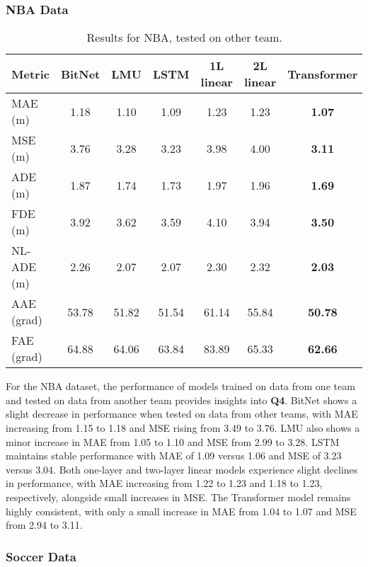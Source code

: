 \subsubsection{NBA Data}

\begin{table}[H]
\centering
\caption{Results for NBA, tested on other team.}
\label{other_team:NBA}
\begin{tabular}{l||c|c|c|c|c|c}

Metric & BitNet & LMU & LSTM & 1L linear & 2L linear & Transformer \\
\hline\hline
MAE (m) & 1.18 & 1.10 & 1.09 & 1.23 & 1.23 & \textbf{1.07} \\
MSE (m) & 3.76 & 3.28 & 3.23 & 3.98 & 4.00 & \textbf{3.11} \\
ADE (m) & 1.87 & 1.74 & 1.73 & 1.97 & 1.96 & \textbf{1.69} \\
FDE (m) & 3.92 & 3.62 & 3.59 & 4.10 & 3.94 & \textbf{3.50} \\
NL-ADE (m) & 2.26 & 2.07 & 2.07 & 2.30 & 2.32 & \textbf{2.03} \\
AAE (grad) & 53.78 & 51.82 & 51.54 & 61.14 & 55.84 & \textbf{50.78} \\
FAE (grad) & 64.88 & 64.06 & 63.84 & 83.89 & 65.33 & \textbf{62.66} \\
\end{tabular}
\end{table}

For the NBA dataset, the performance of models trained on data from one team and tested on data from another team provides insights into \textbf{Q4}. BitNet shows a slight decrease in performance when tested on data from other teams, with MAE increasing from 1.15 to 1.18 and MSE rising from 3.49 to 3.76. LMU also shows a minor increase in MAE from 1.05 to 1.10 and MSE from 2.99 to 3.28. LSTM maintains stable performance with MAE of 1.09 versus 1.06 and MSE of 3.23 versus 3.04. Both one-layer and two-layer linear models experience slight declines in performance, with MAE increasing from 1.22 to 1.23 and 1.18 to 1.23, respectively, alongside small increases in MSE. The Transformer model remains highly consistent, with only a small increase in MAE from 1.04 to 1.07 and MSE from 2.94 to 3.11.

\subsubsection{Soccer Data}

